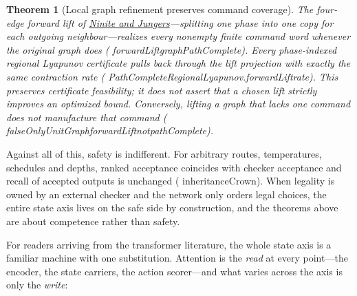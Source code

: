 \documentclass[11pt]{article}
\newtheorem{theorem}{Theorem}[section]
\newcommand{\leanname}[1]{{\scriptsize\ttfamily
  \def\_{\textunderscore\allowbreak}#1}}
\begin{document}
\begin{theorem}[Local graph refinement preserves command coverage]
The four-edge forward lift of
\href{https://arxiv.org/abs/2607.00637}{Ninite and Jungers}---splitting one
phase into one copy for each outgoing neighbour---realizes every nonempty finite
command word whenever the original graph does
(\leanname{forwardLift\_graphPathComplete}). Every phase-indexed regional
Lyapunov certificate pulls back through the lift projection with exactly the
same contraction rate
(\leanname{PathCompleteRegionalLyapunov.forwardLift\_rate}). This preserves
certificate feasibility; it does not assert that a chosen lift strictly
improves an optimized bound. Conversely, lifting a graph that lacks one command
does not manufacture that command
(\leanname{falseOnlyUnitGraph\_forwardLift\_not\_pathComplete}).
\end{theorem}

Against all of this, safety is indifferent. For arbitrary routes, temperatures, schedules
and depths, ranked acceptance coincides with checker acceptance and recall of accepted
outputs is unchanged (\leanname{inheritanceCrown}). When legality is owned by an external
checker and the network only orders legal choices, the entire state axis lives on the safe
side by construction, and the theorems above are about competence rather than safety.

For readers arriving from the transformer literature, the whole state axis is a familiar
machine with one substitution. Attention is the \emph{read} at every point---the encoder,
the state carriers, the action scorer---and what varies across the axis is only the
\emph{write}:

\begin{center}
\end{center}
\end{document}
